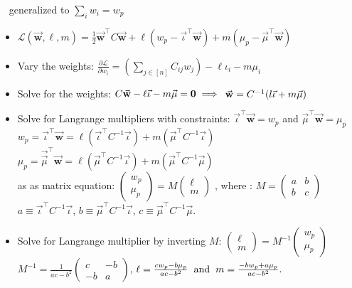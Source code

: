 \documentclass[10pt,landscape,a4paper]{article}
\begin{document}
\begin{multicols*}{3}
\begin{description}[topsep=0pt]
	\item[Portfolio optimization with budget and return constraint] ~ 
	 generalized to $\sum_i {w_i} = w_p$ 
	\begin{itemize}[topsep=0pt]
		\item  
		 $\mathcal{L}(\vec{\mathbf{w}}, \ell, m) = \frac{1}{2} \vec{\mathbf{w}}^{\top} C \vec{\mathbf{w}} + \ell (w_p - \vec{\iota}^\top\vec{\mathbf{w}} ) + m(\mu_p - \vec{\mu}^\top \vec{\mathbf{w}} )$ 
		 \item Vary the weights: 
		 $\frac{\partial{\mathcal{L}}}{\partial{w_i}} = \left(\sum_{j \in [n]}{C_{ij}w_j}\right) - \ell\iota_i-m\mu_i $
		 \item Solve for the weights:   $C\vec{\bf{w}} - \ell \vec{\iota} - m \vec{\mu} = {\bf{0}}  \implies $ 
		 $\vec{\bf w}=C^{-1}(l\vec{\iota}+m \vec{\mu})$
		 \item Solve for Langrange multipliers with constraints:  $ \vec{\iota}^\top\vec{\mathbf{w}} =w_p$ and  $\vec{\mu}^\top \vec{\mathbf{w}}=\mu_p$ 
		 $ 	w_p = \vec{\iota}^\top \vec{\mathbf{w}} = \ell(\vec{\iota}^{\top} C^{-1} \vec{\iota}) + m (\vec{\mu}^{\top} C^{-1} \vec{\iota}) $ \\
		 $ \mu_p = \vec{\vec{\mu}}^\top \vec{\mathbf{w}} = \ell (\vec{\mu}^{\top} C^{-1} \vec{\iota}) + m (\vec{\mu}^{\top} C^{-1} \vec{\mu})$ \\as
		 as matrix equation: $\begin{pmatrix} w_p \\ \mu_p \end{pmatrix} = M\begin{pmatrix} \ell \\ m \end{pmatrix}$ 
		 , where : $  M = \begin{pmatrix} a & b \\ b & c \end{pmatrix} $ \\
		 $a \equiv \vec{\iota}^{\top} C^{-1} \vec{\iota} $,  $b \equiv \vec{\mu}^{\top} C^{-1} \vec{\iota}$,  $c \equiv \vec{\mu}^{\top} C^{-1} \vec{\mu}$.
		 \item Solve for Langrange multiplier by inverting $M$: $\begin{pmatrix} \ell \\ m  \end{pmatrix} = M^{-1}\begin{pmatrix} w_p \\ \mu_p\end{pmatrix}$ \\
		 $M^{-1} = \frac{1}{ac-b^2}\begin{pmatrix} c & -b \\ -b & a \end{pmatrix}$, $\ell = \frac{cw_p-b\mu_p}{ac-b^2} \hspace{2mm} \text{and} \hspace{2mm} m = \frac{-bw_p+a\mu_p}{ac-b^2} .$
		 

\end{itemize}
\end{description}
\end{multicols*}
\end{document}
